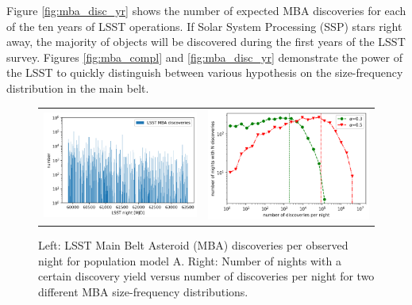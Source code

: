 Figure \ref{fig:mba_disc_yr} shows the number of expected MBA discoveries for each of the ten years of LSST operations. If Solar System Processing (SSP) stars right away, the majority of objects will be discovered during the first years of the LSST survey. Figures \ref{fig:mba_compl} and \ref{fig:mba_disc_yr} demonstrate the power of the LSST to quickly distinguish between various hypothesis on the size-frequency distribution in the main belt. 
%
\begin{figure}[tb!]
\begin{center}
\begin{tabular}{cc}
\includegraphics[width=0.5\linewidth]{figs/disc_per_night.png} &
\includegraphics[width=0.50\linewidth]{figs/disc_stat.png}
\end{tabular}
\end{center}
\caption{Left: LSST Main Belt Asteroid (MBA) discoveries per observed night for population model A. Right: Number of nights with a certain discovery yield versus number of discoveries per night for two different MBA size-frequency distributions.}
\label{fig:mba_disc_stats}       %
\end{figure}

